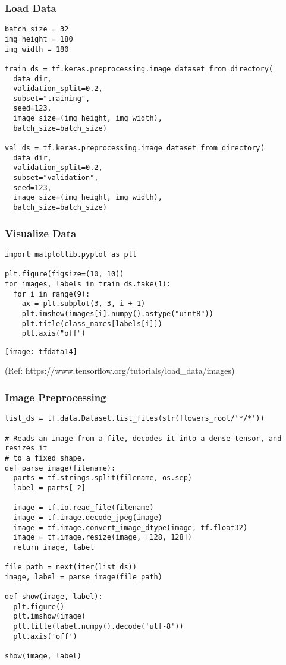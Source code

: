 \begin{frame}[fragile]\frametitle{Load Data}

\begin{lstlisting}
batch_size = 32
img_height = 180
img_width = 180

train_ds = tf.keras.preprocessing.image_dataset_from_directory(
  data_dir,
  validation_split=0.2,
  subset="training",
  seed=123,
  image_size=(img_height, img_width),
  batch_size=batch_size)
	
val_ds = tf.keras.preprocessing.image_dataset_from_directory(
  data_dir,
  validation_split=0.2,
  subset="validation",
  seed=123,
  image_size=(img_height, img_width),
  batch_size=batch_size)
\end{lstlisting}
\end{frame}

\begin{frame}[fragile]\frametitle{Visualize Data}

\begin{lstlisting}
import matplotlib.pyplot as plt

plt.figure(figsize=(10, 10))
for images, labels in train_ds.take(1):
  for i in range(9):
    ax = plt.subplot(3, 3, i + 1)
    plt.imshow(images[i].numpy().astype("uint8"))
    plt.title(class_names[labels[i]])
    plt.axis("off")
\end{lstlisting}

\begin{center}
\texttt{[image: tfdata14]}
\end{center}

{\tiny (Ref: https://www.tensorflow.org/tutorials/load\_data/images)}

\end{frame}


\begin{frame}[fragile]\frametitle{Image Preprocessing}

\begin{lstlisting}
list_ds = tf.data.Dataset.list_files(str(flowers_root/'*/*'))

# Reads an image from a file, decodes it into a dense tensor, and resizes it
# to a fixed shape.
def parse_image(filename):
  parts = tf.strings.split(filename, os.sep)
  label = parts[-2]

  image = tf.io.read_file(filename)
  image = tf.image.decode_jpeg(image)
  image = tf.image.convert_image_dtype(image, tf.float32)
  image = tf.image.resize(image, [128, 128])
  return image, label
	
file_path = next(iter(list_ds))
image, label = parse_image(file_path)

def show(image, label):
  plt.figure()
  plt.imshow(image)
  plt.title(label.numpy().decode('utf-8'))
  plt.axis('off')

show(image, label)
\end{lstlisting}
\end{frame}

